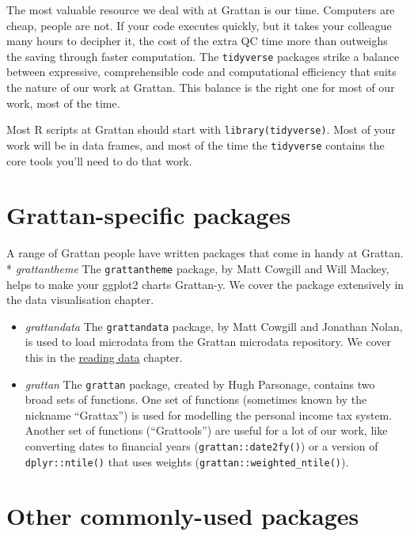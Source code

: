 \documentclass[
]{book}
\begin{document}
The most valuable resource we deal with at Grattan is our time. Computers are cheap, people are not. If your code executes quickly, but it takes your colleague many hours to decipher it, the cost of the extra QC time more than outweighs the saving through faster computation. The \texttt{tidyverse} packages strike a balance between expressive, comprehensible code and computational efficiency that suits the nature of our work at Grattan. This balance is the right one for most of our work, most of the time.

Most R scripts at Grattan should start with \texttt{library(tidyverse)}. Most of your work will be in data frames, and most of the time the \texttt{tidyverse} contains the core tools you'll need to do that work.

\hypertarget{grattan-specific-packages}{%
\section{Grattan-specific packages}\label{grattan-specific-packages}}

A range of Grattan people have written packages that come in handy at Grattan.
* \emph{grattantheme} The \texttt{grattantheme} package, by Matt Cowgill and Will Mackey, helps to make your ggplot2 charts Grattan-y. We cover the package extensively in the data visualisation chapter.

\begin{itemize}
\item
  \emph{grattandata} The \texttt{grattandata} package, by Matt Cowgill and Jonathan Nolan, is used to load microdata from the Grattan microdata repository. We cover this in the \protect\hyperlink{reading-data}{reading data} chapter.
\item
  \emph{grattan} The \texttt{grattan} package, created by Hugh Parsonage, contains two broad sets of functions. One set of functions (sometimes known by the nickname ``Grattax'') is used for modelling the personal income tax system. Another set of functions (``Grattools'') are useful for a lot of our work, like converting dates to financial years (\texttt{grattan::date2fy()}) or a version of \texttt{dplyr::ntile()} that uses weights (\texttt{grattan::weighted\_ntile()}).
\end{itemize}

\hypertarget{other-commonly-used-packages}{%
\section{Other commonly-used packages}\label{other-commonly-used-packages}}
\end{document}
